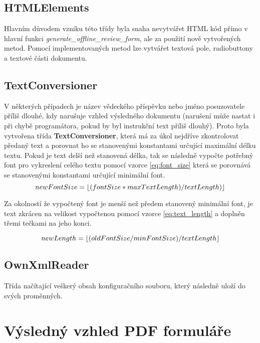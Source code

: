 \subsection{HTMLElements}
Hlavním důvodem vzniku této třídy byla snaha nevytvářet HTML kód přímo v hlavní funkci \textit{generate\_offline\_review\_form}, ale za použití nově vytvořených metod. Pomocí implementovaných metod lze vytvářet textová pole, radiobuttony a textové části dokumentu.
\subsection{TextConversioner}
V některých případech je název vědeckého příspěvku nebo jméno posuzovatele příliš dlouhé, kdy narušuje vzhled výsledného dokumentu (narušení může nastat i při chybě programátora, pokud by byl instrukční text příliš dlouhý). Proto byla vytvořena třída \textbf{TextConversioner}, která má za úkol nejdříve zkontrolovat předaný text a porovnat ho se stanovenými konstantami určující maximální délku textu. Pokud je text delší než stanovená délka, tak se následně vypočte potřebný font pro vykreslení celého textu pomocí vzorce \eqref{eq:font_size} která se porovnává se stanovenými konstantami určující minimální font. 
\begin{equation}
newFontSize = \floor*{(fontSize *  maxTextLength) / textLength)} \label{eq:font_size}
\end{equation}

Za okolností že vypočtený font je menší než předem stanovený minimální font, je text zkrácen na velikost vypočtenou pomocí vzorce  \eqref{eq:text_length} a doplněn třemi tečkami na jeho konci. 

\begin{equation}
newLength = \floor*{(oldFontSize / minFontSize) / textLength} \label{eq:text_length}
\end{equation}
\subsection{OwnXmlReader}
Třída načítající veškerý obsah konfiguračního souboru, který následně uloží do svých proměnných.

\section{Výsledný vzhled PDF formuláře}


